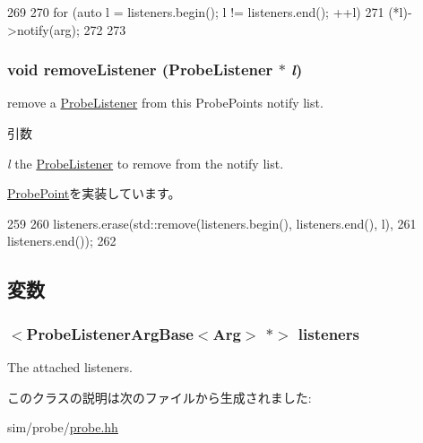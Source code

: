 \begin{DoxyCode}
269     {
270         for (auto l = listeners.begin(); l != listeners.end(); ++l) {
271             (*l)->notify(arg);
272         }
273     }
\end{DoxyCode}
\hypertarget{classProbePointArg_a4b64aec02f5b387eaddd083a3889ca79}{
\subsubsection[{removeListener}]{\setlength{\rightskip}{0pt plus 5cm}void removeListener ({\bf ProbeListener} $\ast$ {\em l})}}
\label{classProbePointArg_a4b64aec02f5b387eaddd083a3889ca79}


remove a \hyperlink{classProbeListener}{ProbeListener} from this ProbePoints notify list. 
\begin{DoxyParams}{引数}
\item[{\em l}]the \hyperlink{classProbeListener}{ProbeListener} to remove from the notify list. \end{DoxyParams}


\hyperlink{classProbePoint_a6a2be0b9d814476147edeeb5afac43a0}{ProbePoint}を実装しています。


\begin{DoxyCode}
259     {
260         listeners.erase(std::remove(listeners.begin(), listeners.end(), l),
261                         listeners.end());
262     }
\end{DoxyCode}


\subsection{変数}
\hypertarget{classProbePointArg_a8ab15f1edc2a743285216937a776d91f}{
\subsubsection[{listeners}]{$<${\bf ProbeListenerArgBase}$<$Arg$>$ $\ast$$>$ {\bf listeners}}}
\label{classProbePointArg_a8ab15f1edc2a743285216937a776d91f}
The attached listeners. 

このクラスの説明は次のファイルから生成されました:\begin{DoxyCompactItemize}
\item 
sim/probe/\hyperlink{probe_8hh}{probe.hh}\end{DoxyCompactItemize}
